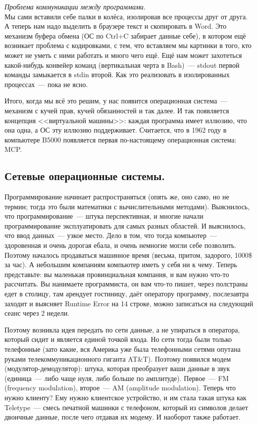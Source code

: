 \documentclass{article}
\begin{document}
    \textit{Проблема коммуникации между программами.}\\
    Мы сами вставили себе палки в колёса, изолировав все процессы друг от друга. А теперь нам надо выделить в браузере текст и скопировать в Word. Это механизм буфера обмена (ОС по Ctrl+C забирает данные себе), в котором ещё возникает проблема с кодировками, с тем, что вставляем мы картинки в того, кто может не уметь с ними работать и много чего ещё. Ещё нам может захотеться какой-нибудь конвейер команд (вертикальная черта в Bash)~--- stdout первой команды замыкается в stdin второй. Как это реализовать в изолированных процессах~--- пока не ясно.
    
    Итого, когда мы всё это решим, у нас появится операционная система~--- механизм с кучей прав, кучей обязанностей и так далее. И так появляется концепция <<виртуальной машины>>: каждая программа имеет иллюзию, что она одна, а ОС эту иллюзию поддерживает. Считается, что в 1962 году в компьютере B5000 появляется первая по-настоящему операционная система: MCP.

    \subsection{Сетевые операционные системы.}
    Программирование начинает распространяться (опять же, оно само, но не термин; тогда это были математики с вычислительными методами). Выяснилось, что программирование~--- штука перспективная, и многие начали программирование эксплуатировать для самых разных областей. И выяснилось, что ввод данных~--- узкое место. Дело в том, что тогда компьютер~--- здоровенная и очень дорогая ебала, и очень немногие могли себе позволить. Поэтому началось продаваться машинное время (весьма, притом, задорого, 1000\$ за час). А небольшим компаниям компьютер иметь у себя ни к чему. Теперь представьте: вы маленькая провинциальная компания, и вам нужно что-то рассчитать. Вы нанимаете программиста, он вам что-то пишет, через полстраны едет в столицу, там арендует гостиницу, даёт оператору программу, послезавтра заходит и выясняет Runtime Error на 14 строке, можно записаться на следующий сеанс через 2 недели.
    
    Поэтому возникла идея передать по сети данные, а не упираться в оператора, который сидит и является единой точкой входа. Но сети тогда были только телефонные (зато какие, вся Америка уже была телефонными сетями опутана руками телекоммуникационного гиганта AT\&T). Поэтому появился модем (модулятор-демодулятор): штука, которая преобразует ваши данные в звук (единица~--- либо чаще нуля, либо больше по амплитуде). Первое~--- FM (frequency modulation), второе~--- AM (amplitude modulation). Теперь что нужно клиенту? Ему нужно клиентское устройство, и им стала такая штука как Teletype~--- смесь печатной машинки с телефоном, который из символов делает двоичные данные, после чего отдавая их модему. И наоборот также работает.
    
\end{document}
